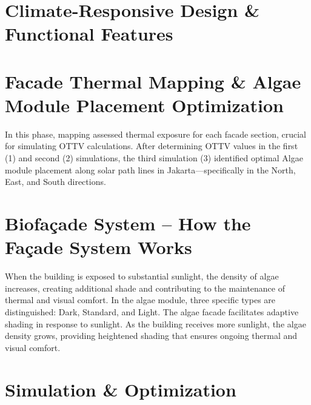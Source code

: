 \section*{
  Climate-Responsive Design \& Functional Features
 }
\begin{minipage}{0.2\linewidth}
	
\end{minipage}
\hfill
\begin{minipage}{0.2\linewidth}
	
\end{minipage}
\hfill
\begin{minipage}{0.2\linewidth}
	
\end{minipage}
\hfill
\begin{minipage}{0.2\linewidth}
	
\end{minipage}
\vfill
\section*{
  Facade Thermal Mapping \& Algae Module Placement Optimization
 }

\vspace*{0.25cm}
In this phase, mapping assessed thermal exposure for each facade section, crucial for simulating OTTV calculations. After determining OTTV values in the first (1) and second (2) simulations, the third simulation (3) identified optimal Algae module placement along solar path lines in Jakarta—specifically in the North, East, and South directions.
\columnbreak%
\section*{
  Biofaçade System -- How the Façade System Works
 }

When the building is exposed to substantial sunlight, the density of algae increases, creating additional shade and contributing to the maintenance of thermal and visual comfort. In the algae module, three specific types are distinguished: Dark, Standard, and Light. The algae facade facilitates adaptive shading in response to sunlight. As the building receives more sunlight, the algae density grows, providing heightened shading that ensures ongoing thermal and visual comfort.
\vfill
\section*{
  Simulation \& Optimization
 }
\vspace*{-\baselineskip}%
